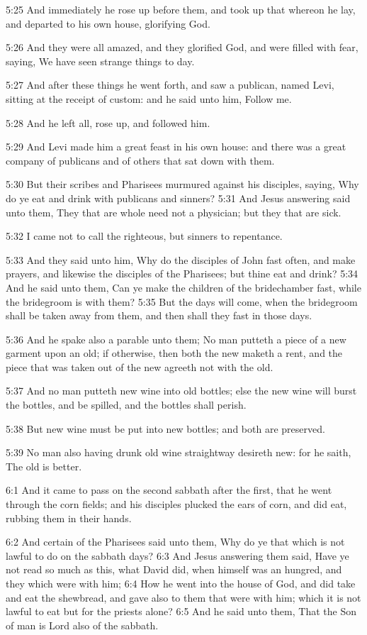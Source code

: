 5:25 And immediately he rose up before them, and took up that whereon he lay, and departed to his own house, glorifying God.

5:26 And they were all amazed, and they glorified God, and were filled with fear, saying, We have seen strange things to day.

5:27 And after these things he went forth, and saw a publican, named Levi, sitting at the receipt of custom: and he said unto him, Follow me.

5:28 And he left all, rose up, and followed him.

5:29 And Levi made him a great feast in his own house: and there was a great company of publicans and of others that sat down with them.

5:30 But their scribes and Pharisees murmured against his disciples, saying, Why do ye eat and drink with publicans and sinners?  5:31 And Jesus answering said unto them, They that are whole need not a physician; but they that are sick.

5:32 I came not to call the righteous, but sinners to repentance.

5:33 And they said unto him, Why do the disciples of John fast often, and make prayers, and likewise the disciples of the Pharisees; but thine eat and drink?  5:34 And he said unto them, Can ye make the children of the bridechamber fast, while the bridegroom is with them?  5:35 But the days will come, when the bridegroom shall be taken away from them, and then shall they fast in those days.

5:36 And he spake also a parable unto them; No man putteth a piece of a new garment upon an old; if otherwise, then both the new maketh a rent, and the piece that was taken out of the new agreeth not with the old.

5:37 And no man putteth new wine into old bottles; else the new wine will burst the bottles, and be spilled, and the bottles shall perish.

5:38 But new wine must be put into new bottles; and both are preserved.

5:39 No man also having drunk old wine straightway desireth new: for he saith, The old is better.

6:1 And it came to pass on the second sabbath after the first, that he went through the corn fields; and his disciples plucked the ears of corn, and did eat, rubbing them in their hands.

6:2 And certain of the Pharisees said unto them, Why do ye that which is not lawful to do on the sabbath days?  6:3 And Jesus answering them said, Have ye not read so much as this, what David did, when himself was an hungred, and they which were with him; 6:4 How he went into the house of God, and did take and eat the shewbread, and gave also to them that were with him; which it is not lawful to eat but for the priests alone?  6:5 And he said unto them, That the Son of man is Lord also of the sabbath.

